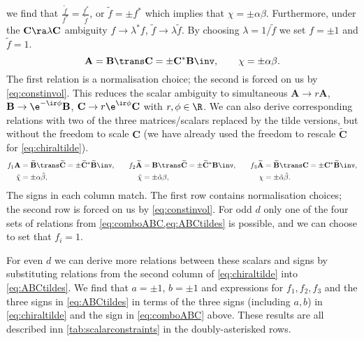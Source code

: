 \documentclass[11pt]{article}
\newcommand{\cc}{^\ast}
\newcommand{\A}{\mathbf{A}}
\newcommand{\B}{\mathbf{B}}
\renewcommand{\C}{\mathbf{C}}
\newcommand{\At}{\widetilde{\A}}
\newcommand{\Bt}{\widetilde{\B}}
\newcommand{\Ct}{\widetilde{\C}}
\newcommand{\alphat}{\tilde{\alpha}}
\newcommand{\betat}{\tilde{\beta}}
\newcommand{\chit}{\tilde{\chi}}
\begin{document}
we find that \( \frac{\tilde{f}}{f\cc} = \frac{f\cc}{\tilde{f}} \),
or \( \tilde{f} = \pm f\cc \) which implies that \(\chi = \pm \alpha \beta\).
Furthermore, under the \(\C \ra \lambda \C\) ambiguity \( f \rightarrow \lambda\cc f\),
\(\tilde{f} \rightarrow \lambda \tilde{f} \).
By choosing \(\lambda = 1/\tilde{f}\) we set \(f = \pm1\) and \(\tilde{f} = 1\).
%
\begin{equation}\label{eq:comboABC}
  \A = \B\trans \C = \pm \C\cc \B\inv, \qquad
  \chi = \pm \alpha \beta.
\end{equation}
%
The first relation is a normalisation choice; the second is forced on us by \cref{eq:constinvol}.
This reduces the scalar ambiguity to simultaneous \( \A \rightarrow r \A \),
\( \B \rightarrow \e^{-\ir\phi} \B \), \( \C \rightarrow r\e^{\ir\phi} \C \)
with \( r, \phi \in \R \).
We can also derive corresponding relations with two of the three matrices/scalars replaced by the tilde versions, but without the freedom to scale \(\C\) (we have already used the freedom to rescale \(\Ct\) for \cref{eq:chiraltilde}).
%
\begin{equation}\label{eq:ABCtildes}
\begin{aligned}
  f_1 \A &= \Bt\trans \Ct = \pm \Ct\cc \Bt\inv, &\quad
  f_2 \At &= \B\trans \Ct = \pm \Ct\cc \B\inv, &\quad
  f_3 \At &= \Bt\trans \C = \pm \C\cc \Bt\inv, \\
  {\chit} &= \pm {\alpha} {\betat}, &
  {\chit} &= \pm {\alphat} {\beta}, &
  {\chi} &= \pm {\alphat} {\betat}.
\end{aligned}
\end{equation}
%
The signs in each column match.
The first row contains normalisation choices; the second row is forced on us by \cref{eq:constinvol}.
For odd \(d\) only one of the four sets of relations from \cref{eq:comboABC,eq:ABCtildes} is possible, and we can choose to set that \(f_i = 1\).

For even \(d\) we can derive more relations between these scalars and signs by substituting relations from the second column of \cref{eq:chiraltilde} into \cref{eq:ABCtildes}.
We find that \(a = \pm 1\), \(b = \pm 1\) and expressions for \(f_1,f_2,f_3\) and the three signs in \cref{eq:ABCtildes} in terms of the three signs (including \(a,b\)) in \cref{eq:chiraltilde} and the sign in \cref{eq:comboABC} above.
These results are all described inn \cref{tab:scalarconstraints} in the doubly-asterisked rows.
\end{document}
